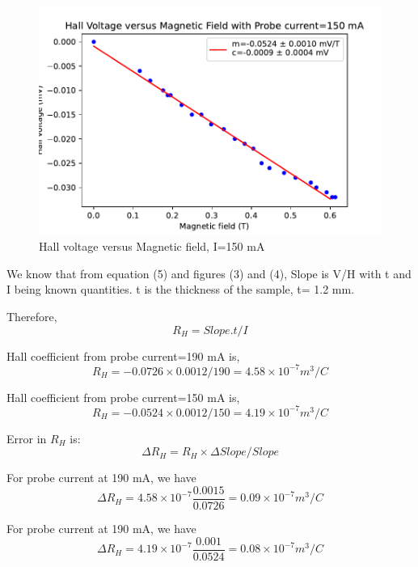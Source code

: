 \documentclass[a4paper, amsfonts, amssymb, amsmath, reprint, showkeys, nofootinbib, twoside]{revtex4-1}
\begin{document}
\begin{figure}[H]
	\centering
	\includegraphics[scale=0.5]{4} 
	\caption{Hall voltage versus Magnetic field, I=150 mA}
	\label{2}
\end{figure}

We know that from equation (5) and figures (3) and (4), Slope is V/H with t and I being known quantities. t is the thickness of the sample, t= 1.2 mm.

Therefore,
\begin{equation}
	R_H=Slope.t/I
\end{equation}

Hall coefficient from probe current=190 mA is,
\begin{equation}
	R_H=-0.0726\times0.0012/190=4.58\times10^{-7} m^3/C
\end{equation}
 
 Hall coefficient from probe current=150 mA is,
 \begin{equation}
 	R_H=-0.0524\times0.0012/150=4.19\times10^{-7} m^3/C
 \end{equation}

Error in $R_H$ is:
\begin{equation}
	\Delta R_H=R_H\times\Delta Slope/Slope
\end{equation}

For probe current at 190 mA, we have
\begin{equation}
	\Delta R_H=4.58\times10^{-7} \frac{0.0015}{0.0726}=0.09\times10^{-7} m^3/C
\end{equation}

For probe current at 190 mA, we have
\begin{equation}
	\Delta R_H=4.19\times10^{-7} \frac{0.001}{0.0524}=0.08\times10^{-7} m^3/C
\end{equation}
\end{document}
